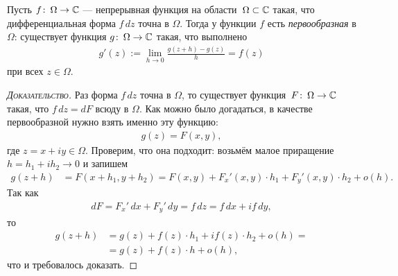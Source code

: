 \documentclass[../complex-analysis.tex]{subfiles}
\begin{document}
\begin{lm}[%
 о первообразной]
 \label{lemma:o_pervoobraznoi}
 Пусть $ f \colon\,\Omega\to\mathbb{C} $ --- непрерывная функция на области~$ \Omega \subset \mathbb{C} $ такая, что дифференциальная форма $ f\,dz $ точна в $ \Omega $. Тогда у функции $ f $ есть \emph{первообразная} в $ \Omega $: существует функция $ g \colon\,\Omega\to\mathbb{C} $ такая, что выполнено
 \begin{align*}
  g'(z) := \lim_{h \to 0} \frac{g(z + h) - g(z)}{h} = f(z)
 \end{align*} при всех $ z \in \Omega $.
\end{lm}
\begin{proof}[\normalfont\textsc{Доказательство}]
 Раз форма $f\, dz$ точна в $ \Omega $, то существует функция~$F \colon\, \Omega \to \mathbb{C} $ такая, что $f\,dz = dF$ всюду в $ \Omega $. Как можно было догадаться, в качестве первообразной нужно взять именно эту функцию:
 \begin{align*}
  g(z) = F(x, y),
 \end{align*} где $ z = x+iy \in \Omega $. Проверим, что она подходит: возьмём малое приращение $ h = h_1 + ih_2 \to 0 $ и запишем
 \begin{align*}
  g(z + h) &= F(x + h_1, y + h_2) = F(x,y) + F_x'(x,y) \cdot h_1 + F_y'(x,y) \cdot h_2 + o(h).
 \end{align*} Так как
 \begin{align*}
  dF = F_x'\,dx + F_y'\,dy = f\,dz = f\,dx + if\,dy,
 \end{align*} то
 \begin{align*}
  g(z+h) &= g(z) + f(z) \cdot h_1 + i f(z) \cdot h_2 + o(h) = \\
  &= g(z) + f(z) \cdot h + o(h),
 \end{align*} что и требовалось доказать.
\end{proof}
\end{document}
